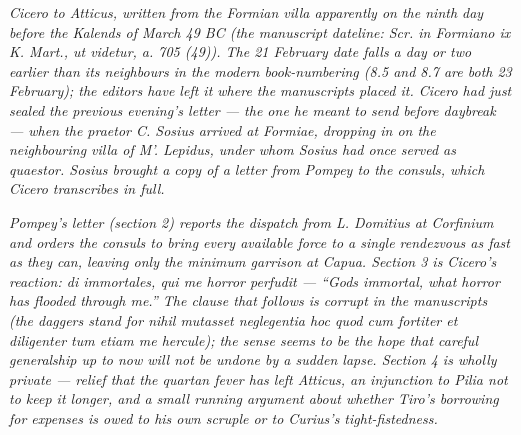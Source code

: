 
\textit{Cicero to Atticus, written from the Formian
villa apparently on the ninth day before the Kalends
of March 49 BC (the manuscript dateline: \textit{Scr.
in Formiano ix K. Mart., ut videtur, a. 705 (49)}).
The 21 February date falls a day or two earlier than
its neighbours in the modern book-numbering (8.5 and
8.7 are both 23 February); the editors have left it
where the manuscripts placed it. Cicero had just
sealed the previous evening's letter --- the one he
meant to send before daybreak --- when the praetor C.
Sosius arrived at Formiae, dropping in on the
neighbouring villa of M'. Lepidus, under whom Sosius
had once served as quaestor. Sosius brought a copy of
a letter from Pompey to the consuls, which Cicero
transcribes in full.}

\textit{Pompey's letter (section 2) reports the
dispatch from L. Domitius at Corfinium and orders the
consuls to bring every available force to a single
rendezvous as fast as they can, leaving only the
minimum garrison at Capua. Section 3 is Cicero's
reaction: \textit{di immortales, qui me horror
perfudit} --- ``Gods immortal, what horror has flooded
through me.'' The clause that follows is corrupt in
the manuscripts (the daggers stand for \textit{nihil
mutasset neglegentia hoc quod cum fortiter et
diligenter tum etiam me hercule}); the sense seems to
be the hope that careful generalship up to now will
not be undone by a sudden lapse. Section 4 is wholly
private --- relief that the quartan fever has left
Atticus, an injunction to Pilia not to keep it longer,
and a small running argument about whether Tiro's
borrowing for expenses is owed to his own scruple or
to Curius's tight-fistedness.}
